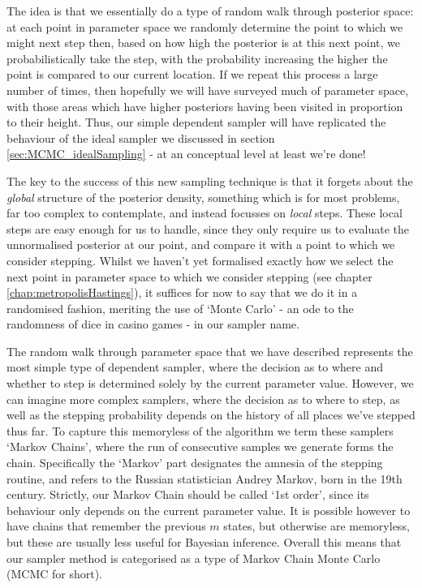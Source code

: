 \documentclass[11pt,fullpage]{book}
\begin{document}
The idea is that we essentially do a type of random walk through posterior space: at each point in parameter space we randomly determine the point to which we might next step then, based on how high the posterior is at this next point, we probabilistically take the step, with the probability increasing the higher the point is compared to our current location. If we repeat this process a large number of times, then hopefully we will have surveyed much of parameter space, with those areas which have higher posteriors having been visited in proportion to their height. Thus, our simple dependent sampler will have replicated the behaviour of the ideal sampler we discussed in section \ref{sec:MCMC_idealSampling} - at an conceptual level at least we're done!

The key to the success of this new sampling technique is that it forgets about the \textit{global} structure of the posterior density, something which is for most problems, far too complex to contemplate, and instead focusses on \textit{local} steps. These local steps are easy enough for us to handle, since they only require us to evaluate the unnormalised posterior at our point, and compare it with a point to which we consider stepping. Whilst we haven't yet formalised exactly how we select the next point in parameter space to which we consider stepping (see chapter \ref{chap:metropolisHastings}), it suffices for now to say that we do it in a randomised fashion, meriting the use of `Monte Carlo' - an ode to the randomness of dice in casino games - in our sampler name. 

The random walk through parameter space that we have described represents the most simple type of dependent sampler, where the decision as to where and whether to step is determined solely by the current parameter value. However, we can imagine more complex samplers, where the decision as to where to step, as well as the stepping probability depends on the history of all places we've stepped thus far. To capture this memoryless of the algorithm we term these samplers `Markov Chains', where the run of consecutive samples we generate forms the chain. Specifically the `Markov' part designates the amnesia of the stepping routine, and refers to the Russian statistician Andrey Markov, born in the 19th century. Strictly, our Markov Chain should be called `1st order', since its behaviour only depends on the current parameter value. It is possible however to have chains that remember the previous $m$ states, but otherwise are memoryless, but these are usually less useful for Bayesian inference. Overall this means that our sampler method is categorised as a type of Markov Chain Monte Carlo (MCMC for short).
\end{document}
